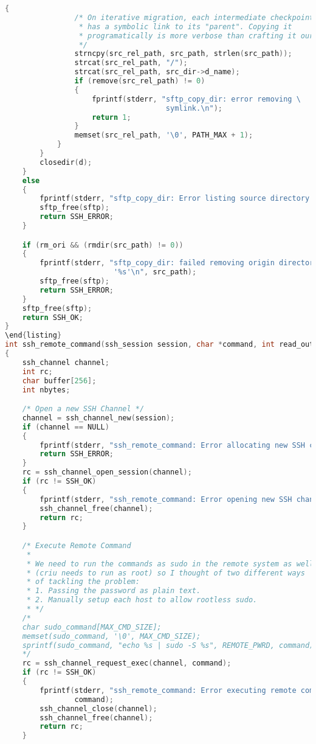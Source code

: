 \begin{lstlisting}[language=C,caption={Signature and schematic implementation of remote execution methods.},label={code:libssh}]
            {
                /* On iterative migration, each intermediate checkpoint dir
                 * has a symbolic link to its "parent". Copying it
                 * programatically is more verbose than crafting it ourselves.
                 */
                strncpy(src_rel_path, src_path, strlen(src_path));
                strcat(src_rel_path, "/");
                strcat(src_rel_path, src_dir->d_name);
                if (remove(src_rel_path) != 0)
                {
                    fprintf(stderr, "sftp_copy_dir: error removing \
                                     symlink.\n");
                    return 1;
                }
                memset(src_rel_path, '\0', PATH_MAX + 1);
            }
        }
        closedir(d);
    }
    else
    {
        fprintf(stderr, "sftp_copy_dir: Error listing source directory!\n");
        sftp_free(sftp);
        return SSH_ERROR;
    }

    if (rm_ori && (rmdir(src_path) != 0))
    {
        fprintf(stderr, "sftp_copy_dir: failed removing origin directory \
                         '%s'\n", src_path);
        sftp_free(sftp);
        return SSH_ERROR;
    }
    sftp_free(sftp);
    return SSH_OK;
}
\end{listing}
int ssh_remote_command(ssh_session session, char *command, int read_output)
{
    ssh_channel channel;
    int rc;
    char buffer[256];
    int nbytes;

    /* Open a new SSH Channel */
    channel = ssh_channel_new(session);
    if (channel == NULL)
    {
        fprintf(stderr, "ssh_remote_command: Error allocating new SSH channel.\n");
        return SSH_ERROR;
    }
    rc = ssh_channel_open_session(channel);
    if (rc != SSH_OK)
    {
        fprintf(stderr, "ssh_remote_command: Error opening new SSH channel.\n");
        ssh_channel_free(channel);
        return rc;
    }

    /* Execute Remote Command 
     *
     * We need to run the commands as sudo in the remote system as well
     * (criu needs to run as root) so I thought of two different ways
     * of tackling the problem:
     * 1. Passing the password as plain text.
     * 2. Manually setup each host to allow rootless sudo.
     * */
    /*
    char sudo_command[MAX_CMD_SIZE];
    memset(sudo_command, '\0', MAX_CMD_SIZE);
    sprintf(sudo_command, "echo %s | sudo -S %s", REMOTE_PWRD, command);
    */
    rc = ssh_channel_request_exec(channel, command);
    if (rc != SSH_OK)
    {
        fprintf(stderr, "ssh_remote_command: Error executing remote command: %s\n",
                command);
        ssh_channel_close(channel);
        ssh_channel_free(channel);
        return rc;
    }


\end{lstlisting}
